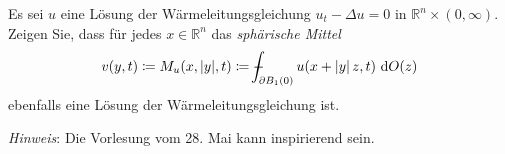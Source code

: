 \begin{exercisePage}
\pagebreak

\begin{task}
	Es sei $u$ eine Lösung der Wärmeleitungsgleichung $u_t-\Delta u=0$ in $\mathbb R^n\times (0,\infty)$. Zeigen Sie, dass für jedes $x\in \mathbb R^n$ das \textit{sphärische Mittel}
	\begin{equation*}
		v(y,t) \defeq M_u(x,|y|, t) \defeq \dashint_{\partial B_1(0)} u(x + \abs{y} z, t) \ \mathrm{d} O(z)
	\end{equation*}
	ebenfalls eine Lösung der Wärmeleitungsgleichung ist.
	
	\textit{Hinweis}: Die Vorlesung vom 28. Mai kann inspirierend sein.
\end{task}

	
\end{exercisePage}